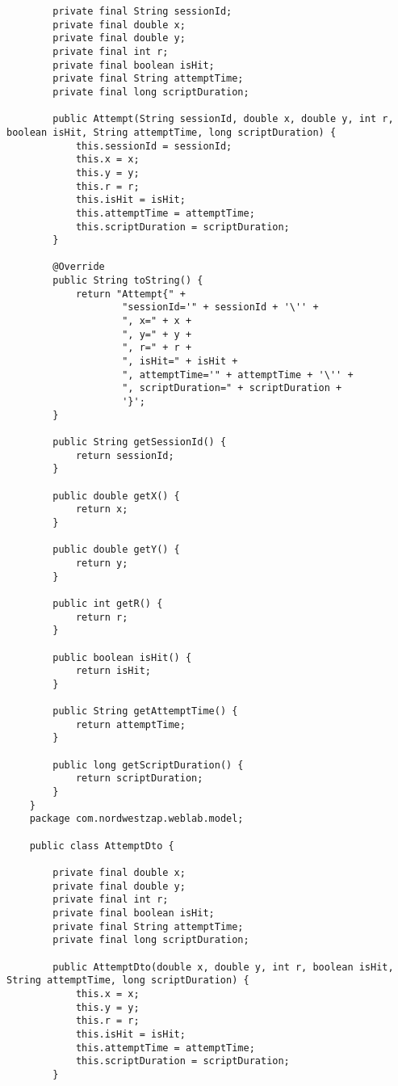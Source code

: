 \documentclass{article}
\begin{document}
\begin{verbatim}
        private final String sessionId;
        private final double x;
        private final double y;
        private final int r;
        private final boolean isHit;
        private final String attemptTime;
        private final long scriptDuration;
    
        public Attempt(String sessionId, double x, double y, int r, boolean isHit, String attemptTime, long scriptDuration) {
            this.sessionId = sessionId;
            this.x = x;
            this.y = y;
            this.r = r;
            this.isHit = isHit;
            this.attemptTime = attemptTime;
            this.scriptDuration = scriptDuration;
        }
    
        @Override
        public String toString() {
            return "Attempt{" +
                    "sessionId='" + sessionId + '\'' +
                    ", x=" + x +
                    ", y=" + y +
                    ", r=" + r +
                    ", isHit=" + isHit +
                    ", attemptTime='" + attemptTime + '\'' +
                    ", scriptDuration=" + scriptDuration +
                    '}';
        }
    
        public String getSessionId() {
            return sessionId;
        }
    
        public double getX() {
            return x;
        }
    
        public double getY() {
            return y;
        }
    
        public int getR() {
            return r;
        }
    
        public boolean isHit() {
            return isHit;
        }
    
        public String getAttemptTime() {
            return attemptTime;
        }
    
        public long getScriptDuration() {
            return scriptDuration;
        }
    }
    package com.nordwestzap.weblab.model;

    public class AttemptDto {
    
        private final double x;
        private final double y;
        private final int r;
        private final boolean isHit;
        private final String attemptTime;
        private final long scriptDuration;
    
        public AttemptDto(double x, double y, int r, boolean isHit, String attemptTime, long scriptDuration) {
            this.x = x;
            this.y = y;
            this.r = r;
            this.isHit = isHit;
            this.attemptTime = attemptTime;
            this.scriptDuration = scriptDuration;
        }
    

\end{verbatim}
\end{document}
